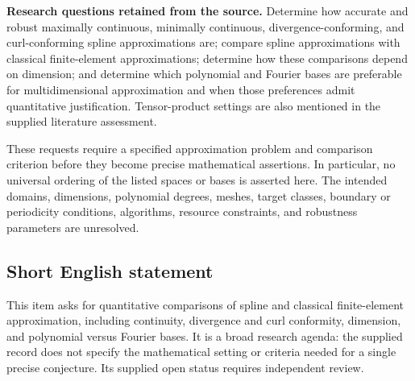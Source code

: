 \documentclass[11pt]{article}
\begin{document}
\textbf{Research questions retained from the source.} Determine how accurate and robust maximally continuous, minimally continuous, divergence-conforming, and curl-conforming spline approximations are; compare spline approximations with classical finite-element approximations; determine how these comparisons depend on dimension; and determine which polynomial and Fourier bases are preferable for multidimensional approximation and when those preferences admit quantitative justification. Tensor-product settings are also mentioned in the supplied literature assessment.

These requests require a specified approximation problem and comparison criterion before they become precise mathematical assertions. In particular, no universal ordering of the listed spaces or bases is asserted here. The intended domains, dimensions, polynomial degrees, meshes, target classes, boundary or periodicity conditions, algorithms, resource constraints, and robustness parameters are unresolved.
\subsection{Short English statement}
This item asks for quantitative comparisons of spline and classical finite-element approximation, including continuity, divergence and curl conformity, dimension, and polynomial versus Fourier bases. It is a broad research agenda: the supplied record does not specify the mathematical setting or criteria needed for a single precise conjecture. Its supplied open status requires independent review.
\end{document}
